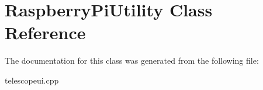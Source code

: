 \hypertarget{classRaspberryPiUtility}{}\section{Raspberry\+Pi\+Utility Class Reference}
\label{classRaspberryPiUtility}


The documentation for this class was generated from the following file\+:\begin{DoxyCompactItemize}
\item 
telescopeui.\+cpp\end{DoxyCompactItemize}
